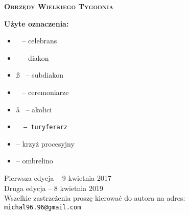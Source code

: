 \begin{center}
	\vspace*{2cm}

 	\hrulefill
	
	\vspace{0.7cm}
	
	\textbf{\textsc{{\Huge{Obrzędy Wielkiego Tygodnia}}\\}}
	
	\vspace{0.5cm}
	
	\hrulefill

	\vspace{\fill}	

	 {\large \textbf{Użyte oznaczenia:}} \\
	
	 \vspace{0.1\textwidth}
	 
	 {\large\centering
	   \begin{itemize}[leftmargin=.43\linewidth,rightmargin=.35\linewidth,label=]
	    \item \ii~ -- celebrans 
	    \item \dd~ -- diakon 
	    \item \ss~ -- subdiakon
 	    \item \cc~ -- ceremoniarze 
	    \item \aa~ -- akolici 
	    \item \tt~ -- turyferarz 
	    \item {} -- krzyż procesyjny
	    \item \oo -- ombrelino
	  \end{itemize}
	 }
	
	\vspace{5cm}	
	
	\hrulefill
	
	{\footnotesize Pierwsza edycja -- 9 kwietnia 2017\\
	Druga edycja -- 8 kwietnia 2019 \\
	Wszelkie zastrzeżenia proszę kierować do autora na adres: \texttt{michal96.96@gmail.com}}
\end{center}

	